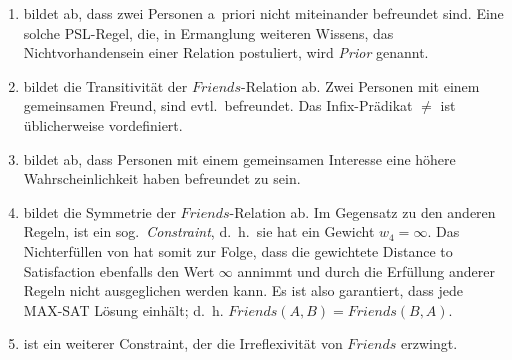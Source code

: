 \begin{enumerate}[label=$(\ruleno{\arabic*})$]
	\item bildet ab, dass zwei Personen a~priori nicht miteinander befreundet sind.
		Eine solche PSL-Regel, die, in Ermanglung weiteren Wissens, das Nichtvorhanden\-sein einer Relation postuliert, wird \textit{Prior} genannt.
	\item bildet die Transitivität der $Friends$-Relation ab.
		Zwei Personen mit einem gemeinsamen Freund, sind evtl.\ befreundet.
		Das Infix-Prädikat $\neq$ ist üblicherweise vordefiniert.
	\item bildet ab, dass Personen mit einem gemeinsamen Interesse eine höhere Wahrscheinlichkeit haben befreundet zu sein.
	\item bildet die Symmetrie der $Friends$-Relation ab.
		Im Gegensatz zu den anderen Regeln, ist  ein sog.\ \textit{Constraint}, d.~h.\ sie hat ein Gewicht $w_4 = \infty$.
		Das Nichterfüllen von  hat somit zur Folge, dass die gewichtete Distance to Satisfaction ebenfalls den Wert $\infty$ annimmt und durch die Erfüllung anderer Regeln nicht ausgeglichen werden kann.
		Es ist also garantiert, dass jede MAX-SAT Lösung  einhält;
		d.~h. $Friends(A, B) = Friends(B, A)$.
	\item ist ein weiterer Constraint, der die Irreflexivität von $Friends$ erzwingt.
\end{enumerate}

